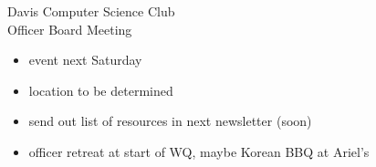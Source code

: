 \documentclass{article}
\begin{document}
\begin{Minutes}{Davis Computer Science Club\\Officer Board Meeting}
\begin{itemize}
\item event next Saturday
\item location to be determined
\end{itemize}

\begin{itemize}
\item send out list of resources in next newsletter (soon)
\item officer retreat at start of WQ, maybe Korean BBQ at Ariel's
\end{itemize}

\thispagestyle{creditfooter}
\end{Minutes}
\end{document}
